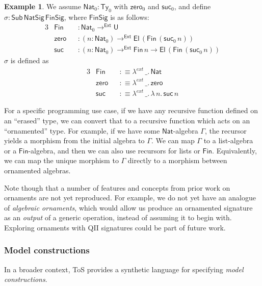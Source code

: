 \documentclass[12pt,a4paper,twoside,openany]{book}
\theoremstyle{remark}
\theoremstyle{definition}
\newtheorem{myexample}{Example}
\theoremstyle{theorem}
\newcommand{\ms}[1]{\mathsf{#1}}
\newcommand{\zero}{\ms{zero}}
\newcommand{\suc}{\ms{suc}}
\newcommand{\Sub}{\mathsf{Sub}}
\newcommand{\Ty}{\mathsf{Ty}}
\newcommand{\U}{\mathsf{U}}
\newcommand{\El}{\mathsf{El}}
\newcommand{\toe}{\to^{\ms{Ext}}}
\newcommand{\Nat}{\ms{Nat}}
\newcommand{\defn}{:\equiv}
\begin{document}
\begin{myexample}
  We assume $\Nat_0 : \Ty_0$ with $\zero_0$ and $\suc_0$, and define $\sigma : \Sub\,\ms{NatSig}\,\ms{FinSig}$, where $\ms{FinSig}$ is as follows:
\begin{alignat*}{3}
  &\ms{Fin}  &&: \Nat_0 \toe \U\\
  &\ms{zero} &&: (n : \Nat_0) \toe \El\,(\ms{Fin}\,(\suc_0\,n))\\
  &\ms{suc}  &&: (n : \Nat_0) \toe \ms{Fin}\,n \to \El\,(\ms{Fin}\,(\suc_0\,n))
\end{alignat*}
$\sigma$ is defined as
\begin{alignat*}{3}
  &\ms{Fin}  &&\defn \lambda^{ext}\,\_.\,\ms{Nat}\\
  &\ms{zero} &&\defn \lambda^{ext}\,\_.\,\ms{zero}\\
  &\ms{suc}  &&\defn \lambda^{ext}\,\_.\,\lambda\,n.\,\ms{suc}\,n
\end{alignat*}
\end{myexample}
For a specific programming use case, if we have any recursive function defined
on an ``erased'' type, we can convert that to a recursive function which acts on
an ``ornamented'' type. For example, if we have some $\Nat$-algebra $\Gamma$,
the recursor yields a morphism from the initial algebra to $\Gamma$. We can map
$\Gamma$ to a list-algebra or a $\ms{Fin}$-algebra, and then we can also use
recursors for lists or $\ms{Fin}$. Equivalently, we can map the unique morphism
to $\Gamma$ directly to a morphism between ornamented algebras.

Note though that a number of features and concepts from prior work on ornaments
are not yet reproduced. For example, we do not yet have an analogue of
\emph{algebraic ornaments}, which would allow us produce an ornamented signature
as an \emph{output} of a generic operation, instead of assuming it to begin
with. Exploring ornaments with QII signatures could be part of future work.

\subsubsection{Model constructions}

In a broader context, ToS provides a synthetic language for specifying
\emph{model constructions}.
\end{document}

